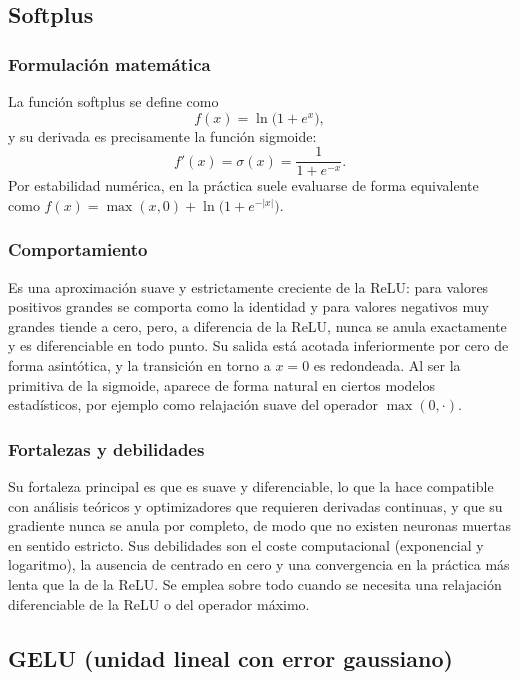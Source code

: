 \documentclass[12pt,a4paper]{article}
\begin{document}
\subsection{Softplus}

\subsubsection{Formulación matemática}
La función softplus se define como
\begin{equation*}
f(x) = \ln\bigl(1 + e^{x}\bigr),
\end{equation*}
y su derivada es precisamente la función sigmoide:
\begin{equation*}
f'(x) = \sigma(x) = \frac{1}{1 + e^{-x}}.
\end{equation*}
Por estabilidad numérica, en la práctica suele evaluarse de forma equivalente como $f(x) = \max(x, 0) + \ln\bigl(1 + e^{-|x|}\bigr)$.

\subsubsection{Comportamiento}
Es una aproximación suave y estrictamente creciente de la ReLU: para valores positivos grandes se comporta como la identidad y para valores negativos muy grandes tiende a cero, pero, a diferencia de la ReLU, nunca se anula exactamente y es diferenciable en todo punto. Su salida está acotada inferiormente por cero de forma asintótica, y la transición en torno a $x = 0$ es redondeada. Al ser la primitiva de la sigmoide, aparece de forma natural en ciertos modelos estadísticos, por ejemplo como relajación suave del operador $\max(0, \cdot)$.

\subsubsection{Fortalezas y debilidades}
Su fortaleza principal es que es suave y diferenciable, lo que la hace compatible con análisis teóricos y optimizadores que requieren derivadas continuas, y que su gradiente nunca se anula por completo, de modo que no existen neuronas muertas en sentido estricto. Sus debilidades son el coste computacional (exponencial y logaritmo), la ausencia de centrado en cero y una convergencia en la práctica más lenta que la de la ReLU. Se emplea sobre todo cuando se necesita una relajación diferenciable de la ReLU o del operador máximo.

\subsection{GELU (unidad lineal con error gaussiano)}
\end{document}
